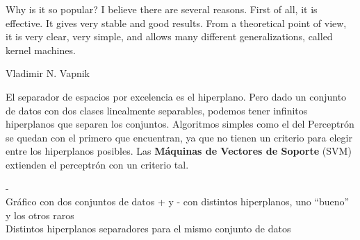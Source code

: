 
\newcommand{\hipf}[1]{ \wv \cdot #1 + b}
\newcommand{\hipfi}{ \hipf{\xi}}
\newcommand{\hipe}[1]{ \hipf{#1} = 0 }
\newcommand{\hipei}{ \hipe{\xi} }
\newcommand{\rangeD}{\range{i}{1}{|D|}}

\newcommand{\maxmin}[2]{\underset{#1}{\text{#2}}}
\newcommand{\maxarg}[1]{\maxmin{#1}{Max} }
\newcommand{\minarg}[1]{\maxmin{#1}{Min} }

\newcommand{\hyi}{h(\xi) y_i }
\newcommand{\hyiz}{\hyi >0}
\newcommand{\hyio}{\hyi \geq 1}

\newcommand{\riz}{r_i \geq 0}
\newcommand{\siz}{\si \geq 0}
\newcommand{\uiz}{\ui \geq 0}
\newcommand{\aiz}{\ai \geq 0}
\newcommand{\aizc}{0 \leq \ai \leq c}

\newcommand{\au}{\alpha_1}
\newcommand{\ad}{\alpha_2}

\newcommand{\costes}{c \sum\limits_i \si}
\newcommand{\costeu}{\sum\limits_i \si \ui}
\newcommand{\costea}{\sum\limits_i \ai r_i }
\newcommand{\costew}{\wv \cdot \wv^t}

\newcommand{\ayi}{\ai y_i }
\newcommand{\ayx}{\ai y_i \xi}
\newcommand{\ayxj}{\aj y_j \xj}
\newcommand{\sumayx}{\sum\limits_i \ai y_i \xi}
\newcommand{\sumay}{\sum\limits_i \ai y_i}
\newcommand{\lagai}{ \sumi \ai - \sumi \suml_j  (\ayx \cdot \aj y_j \xj )  }
\newcommand{\lagd}{\lag_D}

\newcommand{\txi}{\tra(\xi)}



\epigraph{Why is it so popular? I believe there are several reasons. First of all, it is effective. It gives very stable and good results. From a theoretical point of view, it is very clear, very simple, and allows many different generalizations, called kernel machines. }{Vladimir N. Vapnik}


El separador de espacios por excelencia es el hiperplano. Pero dado un conjunto de datos con dos clases linealmente separables, podemos tener infinitos hiperplanos que separen los conjuntos. Algoritmos simples como el del Perceptrón se quedan con el primero que encuentran, ya que no tienen un criterio para elegir entre los hiperplanos posibles. Las \textbf{Máquinas de Vectores de Soporte} (SVM) extienden el perceptrón con un criterio tal.

-\\
Gráfico con dos conjuntos de datos + y - con distintos hiperplanos, uno ``bueno''  y los otros raros\\
Distintos hiperplanos separadores para el mismo conjunto de datos\\

